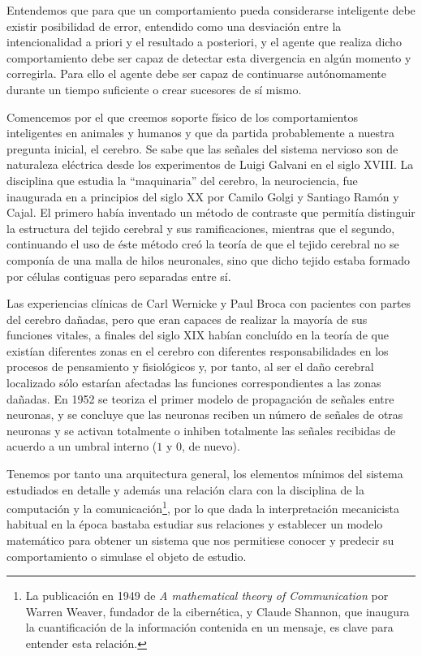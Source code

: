 \documentclass[12pt]{memoir}
\begin{document}
Entendemos que para que un comportamiento pueda considerarse inteligente debe existir posibilidad de error, entendido como una desviación entre la intencionalidad a priori y  el resultado a posteriori, y el agente que realiza dicho comportamiento debe ser capaz de detectar esta divergencia en algún momento y corregirla. Para ello el agente debe ser capaz de continuarse autónomamente durante un tiempo suficiente o crear sucesores de sí mismo.

Comencemos por el que creemos soporte físico de los comportamientos inteligentes en animales y humanos y que da partida probablemente a nuestra pregunta inicial, el cerebro. Se sabe que las señales del sistema nervioso son de naturaleza eléctrica desde los experimentos de Luigi Galvani en el siglo XVIII. La disciplina que estudia la ``maquinaria'' del cerebro, la neurociencia, fue inaugurada en a principios del siglo XX por Camilo Golgi y Santiago Ramón y Cajal. El primero había inventado un método de contraste que permitía distinguir la estructura del tejido cerebral y sus ramificaciones, mientras que el segundo, continuando el uso de éste método creó la teoría de que el tejido cerebral no se componía de una malla de hilos neuronales, sino que dicho tejido estaba formado por células contiguas pero separadas entre sí. 

Las experiencias clínicas de Carl Wernicke y Paul Broca con pacientes con partes del cerebro dañadas, pero que eran capaces de realizar la mayoría de sus funciones vitales, a finales del siglo XIX habían concluído en la teoría de que existían diferentes zonas en el cerebro con diferentes responsabilidades en los procesos de pensamiento y fisiológicos y, por tanto, al ser el daño cerebral localizado sólo estarían afectadas las funciones correspondientes a las zonas dañadas. En 1952 se teoriza el primer modelo de propagación de señales entre neuronas, y se concluye que las neuronas reciben un número de señales de otras neuronas y se activan totalmente o inhiben totalmente las señales recibidas de acuerdo a un umbral interno ($1$ y $0$, de nuevo).

Tenemos por tanto una arquitectura general, los elementos mínimos del sistema estudiados en detalle y además una relación clara con la disciplina de la computación y la comunicación\footnote{La publicación en 1949 de \textit{A mathematical theory of Communication} por Warren Weaver, fundador de la cibernética, y Claude Shannon, que inaugura la cuantificación de la información contenida en un mensaje, es clave para entender esta relación.}, por lo que dada la interpretación mecanicista habitual en la época bastaba estudiar sus relaciones y establecer un modelo matemático para obtener un sistema que nos permitiese conocer y predecir su comportamiento o simulase el objeto de estudio.
\end{document}

